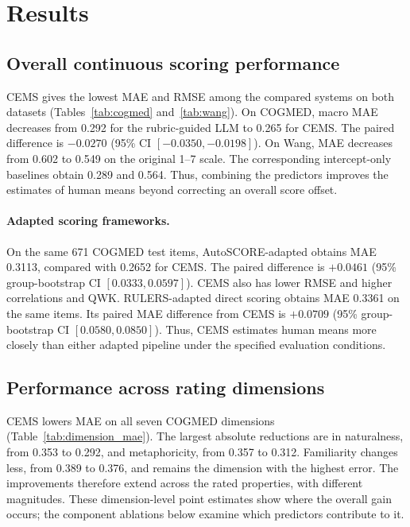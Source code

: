 \section{Results}

\subsection{Overall continuous scoring performance}

CEMS gives the lowest MAE and RMSE among the compared systems on both datasets (Tables~\ref{tab:cogmed} and~\ref{tab:wang}). On COGMED, macro MAE decreases from 0.292 for the rubric-guided LLM to 0.265 for CEMS. The paired difference is $-0.0270$ (95\% CI $[-0.0350,-0.0198]$). On Wang, MAE decreases from 0.602 to 0.549 on the original 1--7 scale. The corresponding intercept-only baselines obtain 0.289 and 0.564. Thus, combining the predictors improves the estimates of human means beyond correcting an overall score offset.







\paragraph{Adapted scoring frameworks.}
\label{sec:adapter_results}
On the same 671 COGMED test items, AutoSCORE-adapted obtains MAE 0.3113, compared with 0.2652 for CEMS. The paired difference is $+0.0461$ (95\% group-bootstrap CI $[0.0333,0.0597]$). CEMS also has lower RMSE and higher correlations and QWK. RULERS-adapted direct scoring obtains MAE 0.3361 on the same items. Its paired MAE difference from CEMS is $+0.0709$ (95\% group-bootstrap CI $[0.0580,0.0850]$). Thus, CEMS estimates human means more closely than either adapted pipeline under the specified evaluation conditions.

\subsection{Performance across rating dimensions}

CEMS lowers MAE on all seven COGMED dimensions (Table~\ref{tab:dimension_mae}). The largest absolute reductions are in naturalness, from 0.353 to 0.292, and metaphoricity, from 0.357 to 0.312. Familiarity changes less, from 0.389 to 0.376, and remains the dimension with the highest error. The improvements therefore extend across the rated properties, with different magnitudes. These dimension-level point estimates show where the overall gain occurs; the component ablations below examine which predictors contribute to it.

